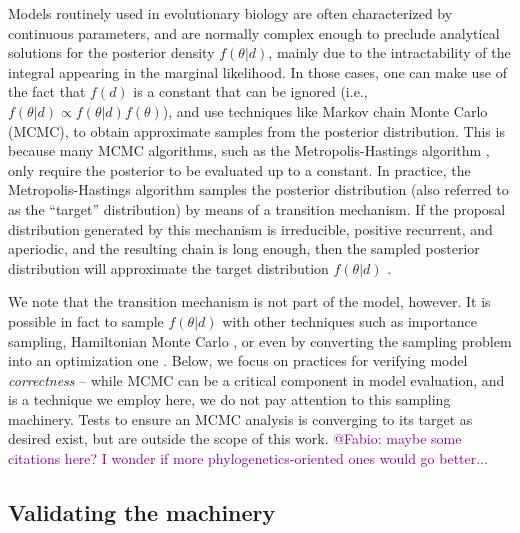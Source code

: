 \documentclass[oneside]{article}
\begin{document}
Models routinely used in evolutionary biology are often characterized by
continuous parameters, and are normally complex enough to preclude
analytical solutions for the posterior density $f(\theta|d)$, mainly
due to the intractability of the integral appearing in the marginal
likelihood.
In those cases, one can make use of the fact that $f(d)$
is a constant that can be ignored (i.e., $f(\theta|d)
\propto f(\theta|d)f(\theta)$), and use 
techniques like Markov chain Monte Carlo (MCMC), to obtain approximate samples from the posterior distribution.
This is because many MCMC algorithms, such as the Metropolis-Hastings algorithm \citep{metropolis53,mh}, only require the
posterior to be evaluated up to a constant.
In practice, the Metropolis-Hastings algorithm samples the posterior
distribution (also referred to as the ``target'' distribution) by means of a
transition mechanism. 
If the proposal distribution generated by this mechanism is
irreducible, positive recurrent, and aperiodic, and the resulting
chain is long enough, then the sampled posterior distribution will approximate
the target distribution $f(\theta|d)$ \citep{smith93,tierney94,gelman}.

We note that the transition mechanism is not part of the model, however.
It is possible in fact to sample $f(\theta|d)$ with other techniques such as
importance sampling, Hamiltonian Monte Carlo \citep{hmc}, or even by converting the
sampling problem into an optimization one \citep[e.g.,][]{zhang18}.
Below, we focus on practices for verifying model \emph{correctness} --
while MCMC can be a critical component in model evaluation, and is
a technique we employ here, we do not pay attention to this sampling
machinery.
Tests to ensure an MCMC analysis is converging to its target as desired
exist, but are outside the scope of this work.
\textcolor{purple}{@Fabio: maybe some citations here? I wonder if more phylogenetics-oriented ones would go better...}

\subsection*{Validating the machinery}
\end{document}
